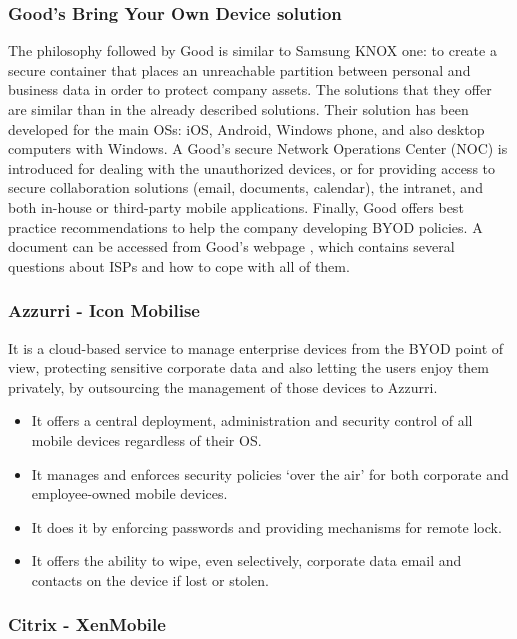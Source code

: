 \subsubsection{Good's Bring Your Own Device solution}

The philosophy followed by Good \cite{Good_tool} is similar to Samsung KNOX one: to create a secure container that places an unreachable partition between personal and business data in order to protect company assets. The solutions that they offer \cite{Good_tool} are similar than in the already described solutions. Their solution has been developed for the main OSs: iOS, Android, Windows phone, and also desktop computers with Windows. A Good's secure Network Operations Center (NOC) is introduced for dealing with the unauthorized devices, or for providing access to secure collaboration solutions (email, documents, calendar), the intranet, and both in-house or third-party mobile applications. Finally, Good offers best practice recommendations to help the company developing BYOD policies. A document can be accessed from Good's webpage \cite{Good_tool}, which contains several questions about ISPs and how to cope with all of them.

\subsubsection{Azzurri - Icon Mobilise}

It is a cloud-based service \cite{Azzurri_tool} to manage enterprise devices from the BYOD point of view, protecting sensitive corporate data and also letting the users enjoy them privately, by outsourcing the management of those devices to Azzurri.
 
\begin{itemize}
\item It offers a central deployment, administration and security control of all mobile devices regardless of their OS. %
\item It manages and enforces security policies `over the air' for both corporate and employee-owned mobile devices.
\item It does it by enforcing passwords and providing mechanisms for remote lock.
\item It offers the ability to wipe, even selectively, corporate data email and contacts on the device if lost or stolen.
\end{itemize}


\subsubsection{Citrix - XenMobile}

